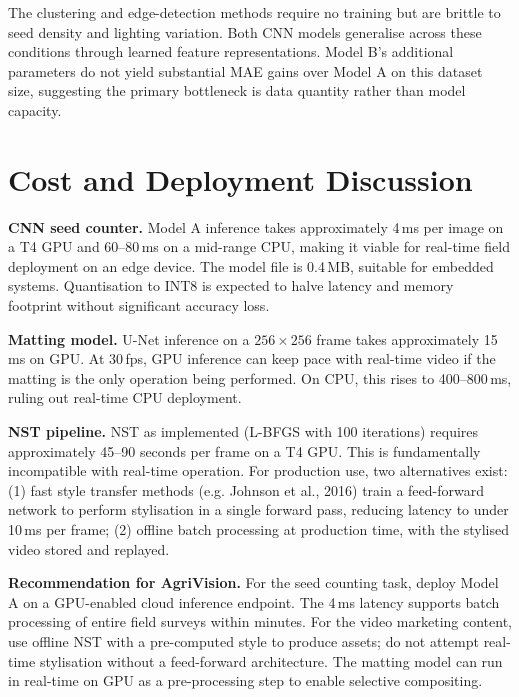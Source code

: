 \documentclass[11pt,a4paper]{article}
\begin{document}
The clustering and edge-detection methods require no training but are brittle to seed
density and lighting variation. Both CNN models generalise across these conditions through
learned feature representations. Model B's additional parameters do not yield substantial
MAE gains over Model A on this dataset size, suggesting the primary bottleneck is data
quantity rather than model capacity.

\section{Cost and Deployment Discussion}
\label{sec:cost}

\textbf{CNN seed counter.} Model A inference takes approximately 4\,ms per image on a
T4 GPU and 60--80\,ms on a mid-range CPU, making it viable for real-time field deployment
on an edge device. The model file is 0.4\,MB, suitable for embedded systems. Quantisation
to INT8 is expected to halve latency and memory footprint without significant accuracy
loss.

\textbf{Matting model.} U-Net inference on a $256\times256$ frame takes approximately
15\,ms on GPU. At 30\,fps, GPU inference can keep pace with real-time video if the matting
is the only operation being performed. On CPU, this rises to 400--800\,ms, ruling out
real-time CPU deployment.

\textbf{NST pipeline.} NST as implemented (L-BFGS with 100 iterations) requires
approximately 45--90 seconds per frame on a T4 GPU. This is fundamentally incompatible
with real-time operation. For production use, two alternatives exist: (1) fast style
transfer methods (e.g. Johnson et al., 2016) train a feed-forward network to perform
stylisation in a single forward pass, reducing latency to under 10\,ms per frame; (2)
offline batch processing at production time, with the stylised video stored and replayed.

\textbf{Recommendation for AgriVision.} For the seed counting task, deploy Model A on
a GPU-enabled cloud inference endpoint. The 4\,ms latency supports batch processing of
entire field surveys within minutes. For the video marketing content, use offline NST
with a pre-computed style to produce assets; do not attempt real-time stylisation without
a feed-forward architecture. The matting model can run in real-time on GPU as a
pre-processing step to enable selective compositing.
\end{document}
